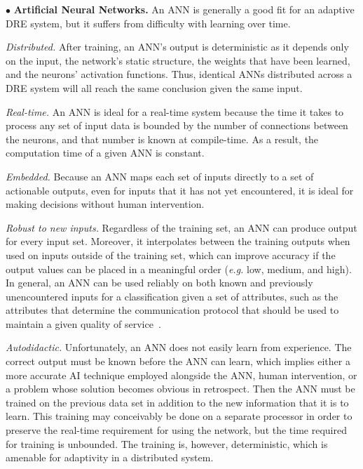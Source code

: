 \documentclass[conference]{IEEEtran}
\begin{document}

$\bullet$ {\bf Artificial Neural Networks.}
An ANN is generally a  good fit for an adaptive DRE system, but it suffers from difficulty with learning over time.

\emph{Distributed.} After training, an ANN's output is deterministic as it depends only on the input, the network's static structure, the weights that have been learned, and the neurons' activation functions. Thus, identical ANNs distributed across a DRE system will all reach the same conclusion given the same input.

\emph{Real-time.} An ANN is ideal for a real-time system because the time it takes to process any set of input data is bounded by the number of connections between the neurons, and that number is known at compile-time. As a result, the computation time of a given ANN is constant.

\emph{Embedded.} Because an ANN maps each set of inputs directly to a set of actionable outputs, even for inputs that it has not yet encountered, it is ideal for making decisions without human intervention.

\emph{Robust to new inputs.} Regardless of the training set, an ANN can produce output for every input set. Moreover, it interpolates between the training outputs when used on inputs outside of the training set, which can improve accuracy if the output values can be placed in a meaningful order (\emph{e.g.} low, medium, and high). In general, an ANN can be used reliably on both known and previously unencountered inputs for a classification given a set of attributes, such as the attributes that determine the communication protocol that should be used to maintain a given quality of service~\cite{Hoffert:10}.

\emph{Autodidactic.} Unfortunately, an ANN does not easily learn from experience. The correct output must be known before the ANN can learn, which implies either a more accurate AI technique employed alongside the ANN, human intervention, or a problem whose solution becomes obvious in retrospect. Then the ANN must be trained on the previous data set in addition to the new information that it is to learn. This training may conceivably be done on a separate processor in order to preserve the real-time requirement for using the network, but the time required for training is unbounded. The training is, however, deterministic, which is amenable for adaptivity in a distributed system.
\end{document}
